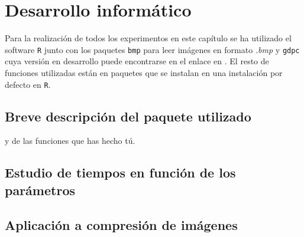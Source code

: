 %
%

\chapter{Desarrollo informático}
\label{ch:informatica}

Para la realización de todos los experimentos en este capítulo se ha utilizado el software \texttt{R} junto con los paquetes \texttt{bmp} para leer imágenes en formato \textit{.bmp} y \texttt{gdpc} cuya versión en desarrollo puede encontrarse en el enlace en \cite{ezeq}. El resto de funciones utilizadas están en paquetes que se instalan en una instalación por defecto en \texttt{R}.

\section{Breve descripción del paquete utilizado}
y de las funciones que has hecho tú.

\section{Estudio de tiempos en función de los parámetros}


\section{Aplicación a compresión de imágenes}


